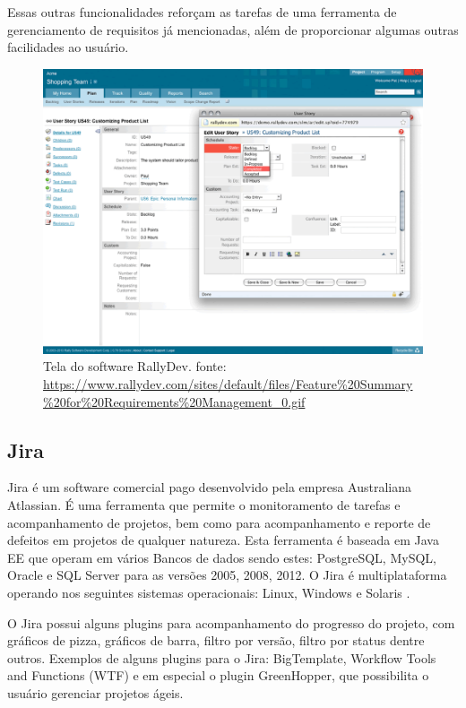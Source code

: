 Essas outras funcionalidades reforçam as tarefas de uma ferramenta de gerenciamento de requisitos já mencionadas, além de proporcionar algumas outras facilidades ao usuário.
\begin{figure}[H]
    \centering
    \label{rallydev}
    \caption[Tela do software RallyDev]{Tela do software RallyDev. fonte: \url{https://www.rallydev.com/sites/default/files/Feature\%20Summary\%20for\%20Requirements\%20Management_0.gif}}
    \includegraphics[keepaspectratio=true,scale=0.4]{figuras/rallydev.eps}
\end{figure}

\subsection{Jira}

Jira é um software comercial pago desenvolvido pela empresa Australiana Atlassian. É uma ferramenta que permite o monitoramento de tarefas e acompanhamento de projetos, bem como para acompanhamento e reporte de defeitos em projetos de qualquer natureza. Esta ferramenta é baseada em Java EE que operam em vários Bancos de dados sendo estes: PostgreSQL, MySQL, Oracle e SQL Server para as versões 2005, 2008, 2012. O Jira é multiplataforma operando nos seguintes sistemas operacionais: Linux, Windows e Solaris \cite{jira2016}. 

O Jira possui alguns plugins para acompanhamento do progresso do projeto, com gráficos de pizza, gráficos de barra, filtro por versão, filtro por status dentre outros. Exemplos de alguns plugins para o Jira: BigTemplate, Workflow Tools and Functions (WTF) e em especial o plugin GreenHopper, que possibilita o usuário gerenciar projetos ágeis. 

